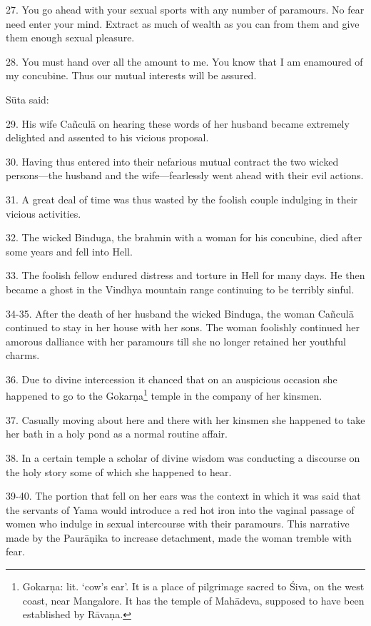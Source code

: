 27. You go ahead with your sexual sports with any number of paramours. No fear
need enter your mind. Extract as much of wealth as you can from them and give
them enough sexual pleasure.

28. You must hand over all the amount to me. You know that I am enamoured of my
concubine. Thus our mutual interests will be assured.

Sūta said:

29. His wife Cañculā on hearing these words of her husband became extremely
delighted and assented to his vicious proposal.

30. Having thus entered into their nefarious mutual contract the two wicked
persons—the husband and the wife—fearlessly went ahead with their evil actions.

31. A great deal of time was thus wasted by the foolish couple indulging in
their vicious activities.

32. The wicked Binduga, the brahmin with a  woman for his concubine,
died after some years and fell into Hell.

33. The foolish fellow endured distress and torture in Hell for many days. He
then became a ghost in the Vindhya mountain range continuing to be terribly
sinful.

34-35. After the death of her husband the wicked Binduga, the woman Cañculā
continued to stay in her house with her sons. The woman foolishly continued her
amorous dalliance with her paramours till she no longer retained her youthful
charms.

36. Due to divine intercession it chanced that on an auspicious occasion she
happened to go to the Gokarṇa\footnote{Gokarṇa: lit. ‘cow’s ear’. It is a place
of pilgrimage sacred to Śiva, on the west coast, near Mangalore. It has the
temple of Mahādeva, supposed to have been established by Rāvaṇa.} temple in the
company of her kinsmen.

37. Casually moving about here and there with her kinsmen she happened to take
her bath in a holy pond as a normal routine affair.

38. In a certain temple a scholar of divine wisdom was conducting a discourse on
the holy  story some of which she happened to hear.

39-40. The portion that fell on her ears was the context in which it was said
that the servants of Yama would introduce a red hot iron into the vaginal
passage of women who indulge in sexual intercourse with their paramours. This
narrative made by the Paurāṇika to increase detachment, made the woman tremble
with fear.

